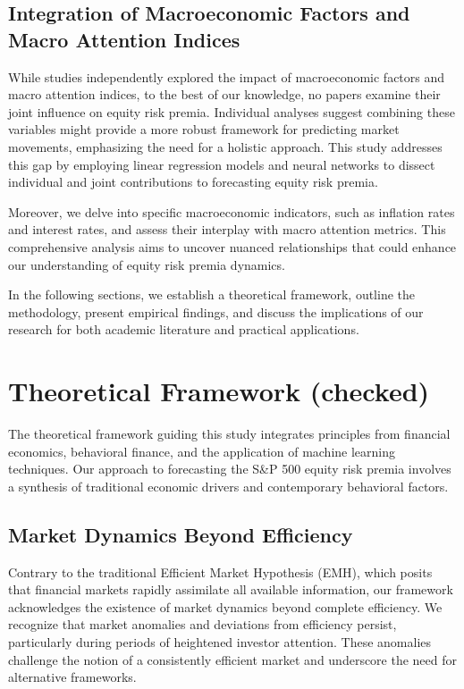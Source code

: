 \documentclass{article}
\begin{document}
\subsection{Integration of Macroeconomic Factors and Macro Attention Indices}

While studies independently explored the impact of macroeconomic factors and macro attention indices, to the best of our knowledge, no papers examine their joint influence on equity risk premia. Individual analyses suggest combining these variables might provide a more robust framework for predicting market movements, emphasizing the need for a holistic approach. This study addresses this gap by employing linear regression models and neural networks to dissect individual and joint contributions to forecasting equity risk premia.

Moreover, we delve into specific macroeconomic indicators, such as inflation rates and interest rates, and assess their interplay with macro attention metrics. This comprehensive analysis aims to uncover nuanced relationships that could enhance our understanding of equity risk premia dynamics.

In the following sections, we establish a theoretical framework, outline the methodology, present empirical findings, and discuss the implications of our research for both academic literature and practical applications.

\newpage

\section{Theoretical Framework (checked)}

The theoretical framework guiding this study integrates principles from financial economics, behavioral finance, and the application of machine learning techniques. Our approach to forecasting the S\&P 500 equity risk premia involves a synthesis of traditional economic drivers and contemporary behavioral factors.

\subsection{Market Dynamics Beyond Efficiency}

Contrary to the traditional Efficient Market Hypothesis (EMH), which posits that financial markets rapidly assimilate all available information, our framework acknowledges the existence of market dynamics beyond complete efficiency. We recognize that market anomalies and deviations from efficiency persist, particularly during periods of heightened investor attention. These anomalies challenge the notion of a consistently efficient market and underscore the need for alternative frameworks.
\end{document}
